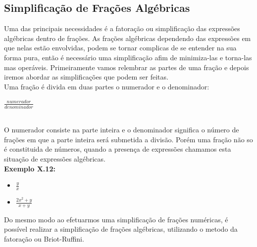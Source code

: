\documentclass[a4paper,12pt,twoside,BCOR=10mm]{scrbook}
\begin{document}
\begin{titlepage}
\section{Simplificação de Frações Algébricas}
Uma das principais necessidades é a fatoração ou simplificação das expressões algébricas dentro de frações. As frações algébricas dependendo das expressões em que nelas estão envolvidas, podem se tornar complicas de se entender na sua forma pura, então é necessário uma simplificação afim de minimiza-las e torna-las mas operáveis. Primeiramente vamos relembrar as partes de uma fração e depois iremos abordar as simplificações que podem ser feitas.
\\
Uma fração é divida em duas partes o numerador e o denominador:
\\
\begin{center}
$\frac{numerador}{denominador}$
\end{center}
\\
O numerador consiste na parte inteira e o denominador significa o número de frações em que a parte inteira será submetida a divisão. Porém uma fração não so é constituida de números, quando a presença de expressões chamamos esta situação de expressões algébricas.
\\
\textbf{Exemplo X.12:}
\\
\begin{itemize}
\item $\frac{y}{x}$
\item $\frac{2x^{2} + y}{x + y}$
\end{itemize}
Do mesmo modo ao efetuarmos uma simplificação de frações numéricas, é possível realizar a simplificação de frações algébricas, utilizando o metodo da fatoração ou Briot-Ruffini.


\end{titlepage}
\end{document}
